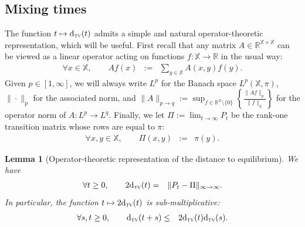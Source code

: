 \documentclass[12pt,final]{article}
\newtheorem{lemma}{Lemma}[section]
\numberwithin{equation}{section}
\newcommand{\dR}{\mathbb {R}}
\newcommand{\dX}{\mathbb{X}}
\newcommand{\dtv}{{\rm d}_{\textsc{tv}}}
\begin{document}
\subsection{Mixing times}\label{sec:mixrel}
The function $t\mapsto\dtv(t)$ admits a simple and natural operator-theoretic representation, which will be useful. First recall that any matrix $A\in\dR^{\dX\times\dX}$ can be viewed as a linear operator acting on functions $f\colon\dX\to\dR$ in the usual way:
\begin{eqnarray}
\label{def:action}
\forall x\in\dX,\qquad Af(x) & := & \sum_{y\in\dX}A(x,y)f(y).
\end{eqnarray}
Given $p\in[1,\infty]$, we will always write $L^p$ for the Banach space $L^p(\dX,\pi)$, $\|\cdot\|_p$ for the associated norm, and $\|A\|_{p\to q}:=\sup_{f\in \dR^\dX\setminus\{0\}}\left\{\frac{\|Af\|_p}{\|f\|_q}\right\}$ for  the operator norm of $A\colon L^p\to L^q$. Finally, we let $\Pi:=\lim_{t\to\infty}P_t$ be the rank-one transition matrix whose rows are equal to $\pi$:
\begin{eqnarray}
\label{def:Pi}
\forall x,y\in\dX,\qquad \Pi(x,y) & := & \pi(y).
\end{eqnarray}
\begin{lemma}[Operator-theoretic representation of the distance to equilibrium]We have
\label{lm:subadd}
\begin{eqnarray*}
\forall t\ge 0,\qquad 2\dtv(t) & = & \|P_t-\Pi\|_{\infty\to\infty}.
\end{eqnarray*}
In particular, the function $t\mapsto 2\dtv(t)$ is sub-multiplicative: 
\begin{eqnarray}
\forall s,t\ge 0,\qquad \dtv(t+s) & \le & 2\dtv(t)\dtv(s).
\end{eqnarray}
\end{lemma}
\end{document}
